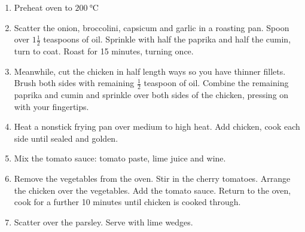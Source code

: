 \documentclass[11pt,a4paper]{article}
\begin{document}
\begin{enumerate}
  \item Preheat oven to $ \qty{200}{\celsius} $
  \item Scatter the onion, broccolini, capsicum and garlic in a roasting pan. Spoon over $ 1 \frac {1}{2} $ teaspoons of oil. Sprinkle with half the paprika and half the cumin, turn to coat. Roast for 15 minutes, turning once.
  \item Meanwhile, cut the chicken in half length ways so you have thinner fillets. Brush both sides with remaining $ \frac{1}{2} $ teaspoon of oil. Combine the remaining paprika and cumin and sprinkle over both sides of the chicken, pressing on with your fingertips.
  \item Heat a nonstick frying pan over medium to high heat. Add chicken, cook each side until sealed and golden.
  \item Mix the tomato sauce: tomato paste, lime juice and wine.
  \item Remove the vegetables from the oven. Stir in the cherry tomatoes. Arrange the chicken over the vegetables. Add the tomato sauce. Return to the oven, cook for a further 10 minutes until chicken is cooked through.
  \item Scatter over the parsley. Serve with lime wedges.
\end{enumerate}
\end{document}
